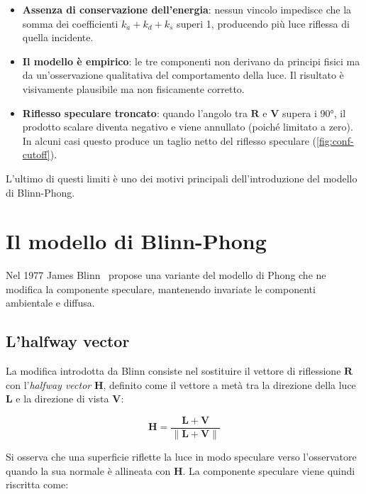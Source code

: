 \documentclass[12pt,a4paper,twoside]{book}
\begin{document}
\begin{itemize}
    \item \textbf{Assenza di conservazione dell'energia}: nessun vincolo impedisce che la somma dei coefficienti $k_a + k_d + k_s$ superi 1, producendo più luce riflessa di quella incidente.
    \item \textbf{Il modello è empirico}: le tre componenti non derivano da principi fisici ma da un'osservazione qualitativa del comportamento della luce. Il risultato è visivamente plausibile ma non fisicamente corretto.
    \item \textbf{Riflesso speculare troncato}: quando l'angolo tra $\mathbf{R}$ e $\mathbf{V}$ supera i 90°, il prodotto scalare diventa negativo e viene annullato (poiché limitato a zero). In alcuni casi questo produce un taglio netto del riflesso speculare (\cref{fig:conf-cutoff}).
\end{itemize}

L'ultimo di questi limiti è uno dei motivi principali dell'introduzione del modello di Blinn-Phong.

\section{Il modello di Blinn-Phong}
\label{sec:blinn-phong}

Nel 1977 James Blinn~\cite{blinn1977} propose una variante del modello di Phong che ne modifica la componente speculare, mantenendo invariate le componenti ambientale e diffusa.

\subsection{L'halfway vector}
\label{subsec:half-vector}

La modifica introdotta da Blinn consiste nel sostituire il vettore di riflessione $\mathbf{R}$ con l'\textit{halfway vector} $\mathbf{H}$, definito come il vettore a metà tra la direzione della luce $\mathbf{L}$ e la direzione di vista $\mathbf{V}$:

\begin{equation}
    \mathbf{H} = \frac{\mathbf{L} + \mathbf{V}}
    {\|\mathbf{L} + \mathbf{V}\|}
    \label{eq:halfvector}
\end{equation}

Si osserva che una superficie riflette la luce in modo speculare verso l'osservatore quando la sua normale è allineata con $\mathbf{H}$. La componente speculare viene quindi riscritta come:
\end{document}
